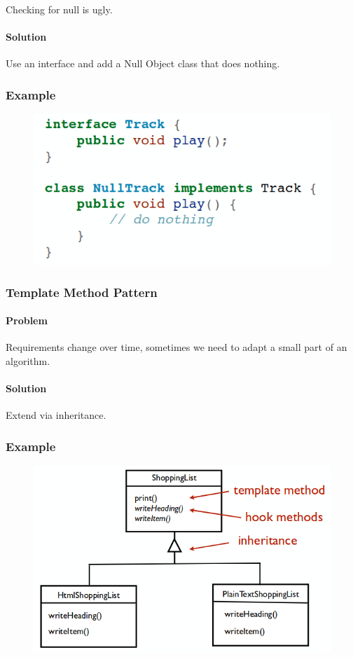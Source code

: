 \documentclass[twocolumn,english]{article}
\begin{document}
Checking for null is ugly.

\paragraph{Solution}

Use an interface and add a Null Object class that does nothing.

\subsubsection*{Example}

\begin{figure}[H]
\centering{}\includegraphics[width=0.4\columnwidth]{img/null-object}
\end{figure}

\subsubsection{Template Method Pattern}

\paragraph{Problem}

Requirements change over time, sometimes we need to adapt a small
part of an algorithm.

\paragraph{Solution}

Extend via inheritance.

\subsubsection*{Example}

\begin{figure}[H]
\centering{}\includegraphics[width=0.5\columnwidth]{img/template-method}
\end{figure}
\end{document}
